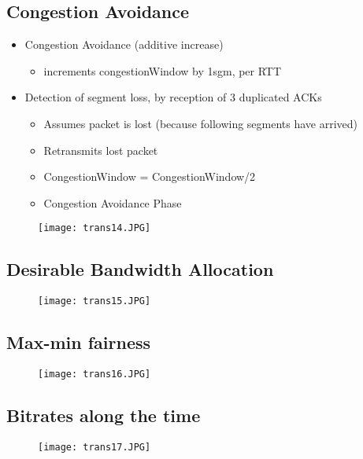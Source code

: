 \documentclass[../resumosRCOM.tex]{subfiles}
\begin{document}
\subsection{Congestion Avoidance}
\begin{itemize}
    \item Congestion Avoidance (additive increase)
    \begin{itemize}
        \item increments congestionWindow by 1sgm, per RTT
    \end{itemize}
    \item Detection of segment loss, by reception of 3 duplicated ACKs
    \begin{itemize}
        \item Assumes packet is lost (because following segments have arrived)
        \item Retransmits lost packet
        \item CongestionWindow = CongestionWindow/2
        \item Congestion Avoidance Phase
    \end{itemize}
\end{itemize}
\begin{figure}[h]
    \centering
    \texttt{[image: trans14.JPG]}
\end{figure}

\subsection{Desirable Bandwidth Allocation}
\begin{figure}[h]
    \centering
    \texttt{[image: trans15.JPG]}
\end{figure}

\subsection{Max-min fairness}
\begin{figure}[h]
    \centering
    \texttt{[image: trans16.JPG]}
\end{figure}

\subsection{Bitrates along the time}
\begin{figure}[h]
    \centering
    \texttt{[image: trans17.JPG]}
\end{figure}
\end{document}
